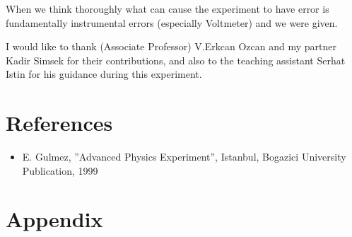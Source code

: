 \documentclass[aps,nofootinbib,onecolumn,groupedaddress,a4paper]{revtex4}
\begin{document}
                         
When we think thoroughly what can cause the experiment to have error is fundamentally instrumental errors (especially Voltmeter) and we were given. 




\begin{acknowledgements}
I would like to thank (Associate Professor) V.Erkcan Ozcan  and my partner Kadir Simsek for their contributions, and also to the teaching assistant Serhat Istin for his guidance during this experiment.

\end{acknowledgements}

\section{References}
\begin{itemize}
\item 	E. Gulmez, ”Advanced Physics Experiment”, Istanbul, Bogazici University Publication, 1999
\end{itemize}

\section{Appendix}
\end{document}
